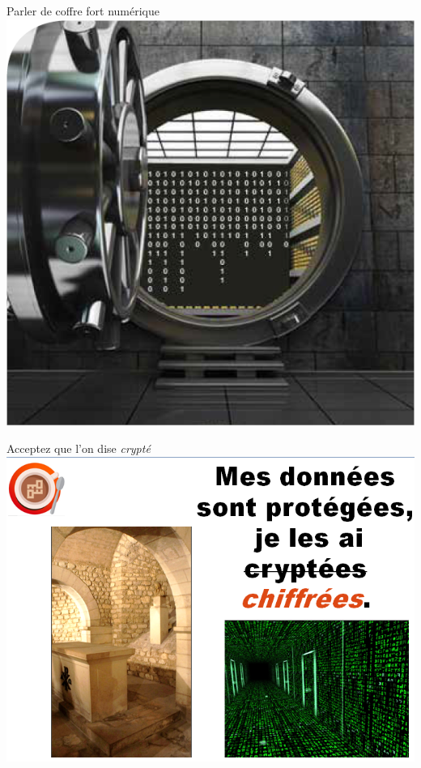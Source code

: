 \documentclass{beamer}
\begin{document}
\begin{frame}
\begin{center}
\Huge{Parler de coffre fort numérique}
\includegraphics[scale=0.5]{./images/coffre_fort_numerique.png}
\end{center}
\end{frame}

\begin{frame}
\begin{center}
\Huge{Acceptez que l'on dise \emph{crypté}}
\includegraphics[scale=0.5]{./images/chiffrees_vs_cryptees.png}
\end{center}
\end{frame}
\end{document}
